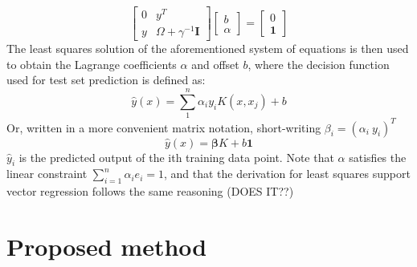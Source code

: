 \documentclass[preprint,12pt]{elsarticle}
\begin{document}
\begin{equation}
	\begin{bmatrix}
		0 & y^T \\
		y & \Omega + \gamma^{-1} \mathbf{I}
		\end{bmatrix}	
		\begin{bmatrix}
		b \\
		\alpha
		\end{bmatrix}
		=
		\begin{bmatrix}
		0 \\
		\mathbf{1}
	\end{bmatrix}	
\end{equation}
The least squares solution of the aforementioned system of equations is then used to  obtain the Lagrange coefficients $\alpha$ and offset $b$, where the decision function used for test set prediction is defined as:
\begin{equation}
	\hat{y}(x) = \sum_{1}^{n} \alpha_i y_i K(x, x_j) + b	
	\label{eq:classification}
\end{equation}
Or, written in a more convenient matrix notation, short-writing $\beta_i= (\alpha_i \  y_i)^T$
\begin{equation}
	\hat{y}(x) = \mathbf{\beta} K + b \mathbf{1}
	\label{eq:prediction}
\end{equation}
$\hat{y}_i$ is the predicted output of the ith training data point. Note that $\alpha$ satisfies the linear constraint $\sum_{i=1}^{n} \alpha_i  e_i = 1$, and that the derivation for least squares support vector regression follows the same reasoning (DOES IT??) %

\newpage

\section{Proposed method}
%
\end{document}
